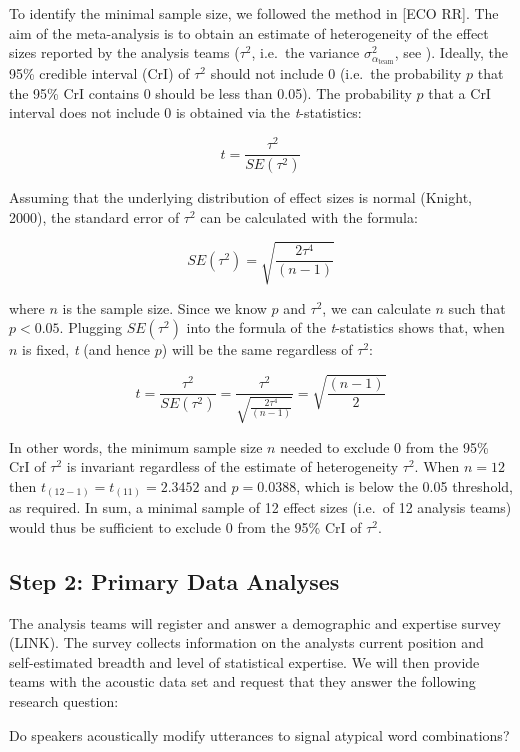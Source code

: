 \documentclass[
  english,
  man,floatsintext]{apa6}
\begin{document}
To identify the minimal sample size, we followed the method in {[}ECO RR{]}.
The aim of the meta-analysis is to obtain an estimate of heterogeneity of the effect sizes reported by the analysis teams (\(\tau^2\), i.e.~the variance \(\sigma^2_{\alpha_{\text{team}}}\), see ).
Ideally, the 95\% credible interval (CrI) of \(\tau^2\) should not include 0 (i.e.~the probability \(p\) that the 95\% CrI contains 0 should be less than 0.05).
The probability \(p\) that a CrI interval does not include 0 is obtained via the \emph{t}-statistics:

\[t = \frac{\tau^2}{SE(\tau^2)}\]

Assuming that the underlying distribution of effect sizes is normal (Knight, 2000), the standard error of \(\tau^2\) can be calculated with the formula:

\[SE(\tau^2) = \sqrt{\frac{2\tau^4}{(n-1)}}\]

where \(n\) is the sample size.
Since we know \(p\) and \(\tau^2\), we can calculate \(n\) such that \(p < 0.05\).
Plugging \(SE(\tau^2)\) into the formula of the \emph{t}-statistics shows that, when \(n\) is fixed, \emph{t} (and hence \(p\)) will be the same regardless of \(\tau^2\):

\[t = \frac{\tau^2}{SE(\tau^2)} = \frac{\tau^2}{\sqrt{\frac{2\tau^4}{(n-1)}}} = \sqrt{\frac{(n-1)}{2}}\]

In other words, the minimum sample size \(n\) needed to exclude 0 from the 95\% CrI of \(\tau^2\) is invariant regardless of the estimate of heterogeneity \(\tau^2\).
When \(n = 12\) then \(t_{(12-1)} = t_{(11)} = 2.3452\) and \(p = 0.0388\), which is below the 0.05 threshold, as required.
In sum, a minimal sample of 12 effect sizes (i.e.~of 12 analysis teams) would thus be sufficient to exclude 0 from the 95\% CrI of \(\tau^2\).

\hypertarget{step-2-primary-data-analyses}{%
\subsection{Step 2: Primary Data Analyses}\label{step-2-primary-data-analyses}}

The analysis teams will register and answer a demographic and expertise survey (LINK).
The survey collects information on the analysts current position and self-estimated breadth and level of statistical expertise.
We will then provide teams with the acoustic data set and request that they answer the following research question:

Do speakers acoustically modify utterances to signal atypical word combinations?
\end{document}
